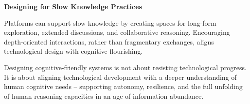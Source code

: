 \textbf{Designing for Slow Knowledge Practices}

Platforms can support slow knowledge by creating spaces for long-form
exploration, extended discussions, and collaborative reasoning.
Encouraging depth-oriented interactions, rather than fragmentary
exchanges, aligns technological design with cognitive flourishing.

Designing cognitive-friendly systems is not about resisting
technological progress. It is about aligning technological development
with a deeper understanding of human cognitive needs -- supporting
autonomy, resilience, and the full unfolding of human reasoning
capacities in an age of information abundance.

